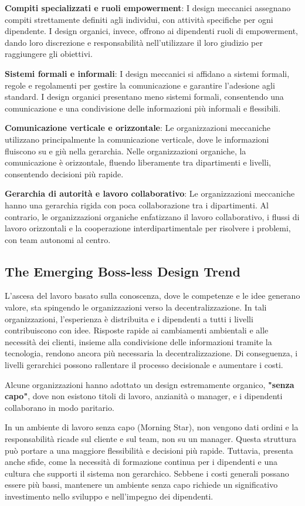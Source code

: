 \documentclass{article}
\begin{document}
\textbf{Compiti specializzati e ruoli empowerment}: I design meccanici assegnano compiti strettamente definiti agli individui, con attività specifiche per ogni dipendente. I design organici, invece, offrono ai dipendenti ruoli di empowerment, dando loro discrezione e responsabilità nell'utilizzare il loro giudizio per raggiungere gli obiettivi.

\textbf{Sistemi formali e informali}: I design meccanici si affidano a sistemi formali, regole e regolamenti per gestire la comunicazione e garantire l'adesione agli standard. I design organici presentano meno sistemi formali, consentendo una comunicazione e una condivisione delle informazioni più informali e flessibili.

\textbf{Comunicazione verticale e orizzontale}: Le organizzazioni meccaniche utilizzano principalmente la comunicazione verticale, dove le informazioni fluiscono su e giù nella gerarchia. Nelle organizzazioni organiche, la comunicazione è orizzontale, fluendo liberamente tra dipartimenti e livelli, consentendo decisioni più rapide.

\textbf{Gerarchia di autorità e lavoro collaborativo}: Le organizzazioni meccaniche hanno una gerarchia rigida con poca collaborazione tra i dipartimenti. Al contrario, le organizzazioni organiche enfatizzano il lavoro collaborativo, i flussi di lavoro orizzontali e la cooperazione interdipartimentale per risolvere i problemi, con team autonomi al centro.

\subsection{The Emerging Boss-less Design Trend}
L'ascesa del lavoro basato sulla conoscenza, dove le competenze e le idee generano valore, sta spingendo le organizzazioni verso la decentralizzazione. In tali organizzazioni, l'esperienza è distribuita e i dipendenti a tutti i livelli contribuiscono con idee. Risposte rapide ai cambiamenti ambientali e alle necessità dei clienti, insieme alla condivisione delle informazioni tramite la tecnologia, rendono ancora più necessaria la decentralizzazione. Di conseguenza, i livelli gerarchici possono rallentare il processo decisionale e aumentare i costi.

Alcune organizzazioni hanno adottato un design estremamente organico, \textbf{"senza capo"}, dove non esistono titoli di lavoro, anzianità o manager, e i dipendenti collaborano in modo paritario.

In un ambiente di lavoro senza capo (Morning Star), non vengono dati ordini e la responsabilità ricade sul cliente e sul team, non su un manager. Questa struttura può portare a una maggiore flessibilità e decisioni più rapide. Tuttavia, presenta anche sfide, come la necessità di formazione continua per i dipendenti e una cultura che supporti il sistema non gerarchico. Sebbene i costi generali possano essere più bassi, mantenere un ambiente senza capo richiede un significativo investimento nello sviluppo e nell'impegno dei dipendenti.
\end{document}
